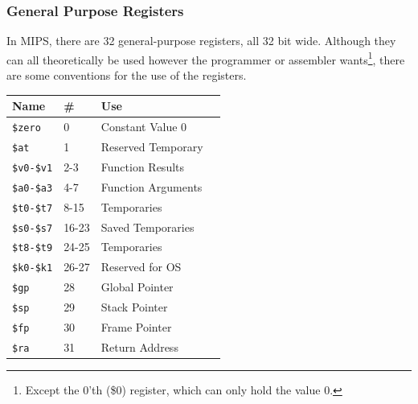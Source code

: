 \subsubsection{General Purpose Registers}
In MIPS, there are 32 general-purpose registers, all 32 bit wide. Although they
can all theoretically be used however the programmer or assembler
wants\footnote{Except the 0'th (\$0) register, which can only hold the value 0.}, there
are some conventions for the use of the registers.
\begin{center}
    \begin{tabular}{ | l | l | l | c |}
    \hline
	\textbf{Name} & \textbf{\#} & \textbf{Use} \\ \hline \hline
	\texttt{\$zero}		& 0 	& Constant Value 0 \\ \hline
	\texttt{\$at}		& 1 	& Reserved Temporary \\ \hline
	\texttt{\$v0-\$v1}	& 2-3 	& Function Results \\ \hline
	\texttt{\$a0-\$a3}	& 4-7 	& Function Arguments \\ \hline
	\texttt{\$t0-\$t7}	& 8-15 	& Temporaries  \\ \hline
	\texttt{\$s0-\$s7}	& 16-23	& Saved Temporaries \\ \hline
	\texttt{\$t8-\$t9}	& 24-25	& Temporaries \\ \hline
	\texttt{\$k0-\$k1}	& 26-27	& Reserved for OS \\ \hline
	\texttt{\$gp} 		& 28 	& Global Pointer \\ \hline
	\texttt{\$sp}		& 29 	& Stack Pointer \\ \hline
	\texttt{\$fp}		& 30 	& Frame Pointer \\ \hline
	\texttt{\$ra}		& 31 	& Return Address \\ \hline
    \end{tabular}
\end{center}

